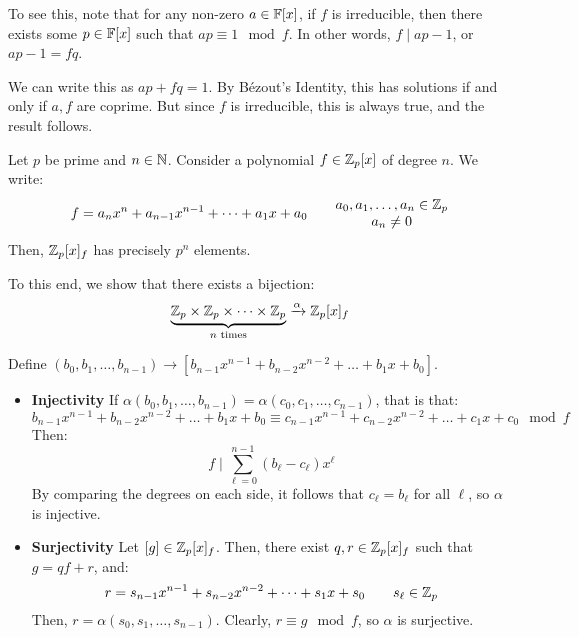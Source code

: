 \documentclass{article}
\begin{document}
To see this, note that for any non-zero $ a \in \mathbb{F}[x] $, if $ f $ is irreducible,
then there exists some $ p \in \mathbb{F}[x] $ such that $ ap \equiv 1 \mod f $.
In other words, $ f \mid ap - 1 $, or $ ap - 1 = fq $.

We can write this as $ ap + fq = 1 $.
By B\'ezout's Identity, this has solutions if and only if $ a, f $ are coprime.
But since $ f $ is irreducible, this is always true, and the result follows.

\begin{thm}
    Let $ p $ be prime and $ n \in \mathbb{N} $.
    Consider a polynomial $ f \in \mathbb{Z}_{p}[x] $ of degree $ n $. We write:
    \begin{equation*}
        f = a_{n}x^{n} + a_{n-1}x^{n-1} + \dots + a_{1}x + a_{0} \qquad
        \begin{matrix} a_{0}, a_{1}, \dots, a_{n} \in \mathbb{Z}_{p} \\ a_{n} \neq 0 \end{matrix}
    \end{equation*}
    Then, $ \mathbb{Z}_{p}[x]_{f} $ has precisely $ p^{n} $ elements.
\end{thm}
To this end, we show that there exists a bijection:
\begin{equation*}
    \underbrace{\mathbb{Z}_{p} \times \mathbb{Z}_{p} \times \cdots \times \mathbb{Z}
    _{p}}_{n \textrm{ times}} \xrightarrow{\alpha} \mathbb{Z}_{p}[x]_{f}
\end{equation*}

Define $ (b_{0}, b_{1}, \dots, b_{n-1}) \rightarrow
[b_{n-1}x^{n-1} + b_{n-2}x^{n-2} + \dots + b_{1}x + b_{0}] $.
\begin{itemize}
    \item \textbf{Injectivity} \vsp
        If $ \alpha(b_{0}, b_{1}, \dots, b_{n-1}) = \alpha(c_{0}, c_{1}, \dots, c_{n-1}) $,
        that is that:
        \begin{equation*}
            b_{n-1}x^{n-1} + b_{n-2}x^{n-2} + \dots + b_{1}x + b_{0}
            \equiv c_{n-1}x^{n-1} + c_{n-2}x^{n-2} + \dots + c_{1}x + c_{0} \mod f
        \end{equation*}
        Then:
        \begin{equation*}
            f \mid \sum_{\ell=0}^{n-1} (b_{\ell}-c_{\ell})x^{\ell}
        \end{equation*}
        By comparing the degrees on each side, it follows that
        $ c_{\ell} = b_{\ell} $ for all $ \ell $, so $ \alpha $ is injective.
    \item \textbf{Surjectivity} \vsp
        Let $ [g] \in \mathbb{Z}_{p}[x]_{f} $. Then, there exist $ q, r \in \mathbb{Z}_{p}[x]_{f} $
        such that $ g = qf + r $, and:
        \begin{equation*}
            r = s_{n-1}x^{n-1} + s_{n-2}x^{n-2} + \dots + s_{1}x + s_{0} \qquad
            s_{\ell} \in \mathbb{Z}_{p}
        \end{equation*}
        Then, $ r = \alpha(s_{0}, s_{1}, \dots, s_{n-1}) $.
        Clearly, $ r \equiv g \mod f $, so $ \alpha $ is surjective.
\end{itemize}
\end{document}
